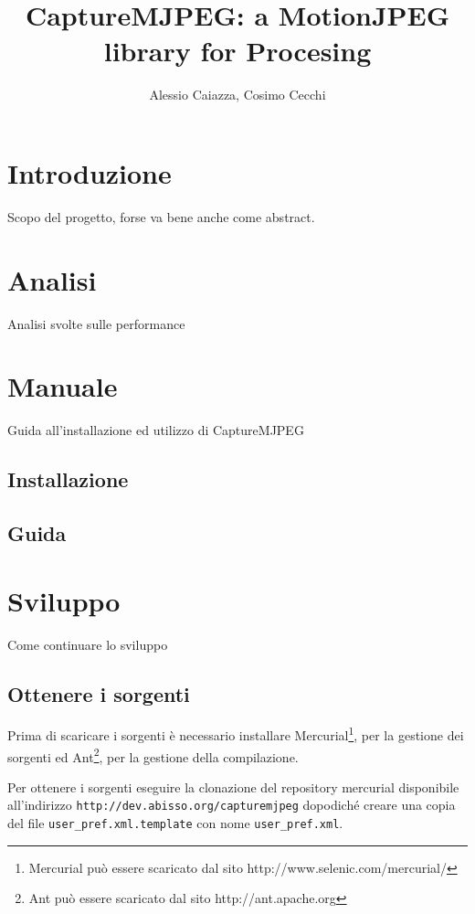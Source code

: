 \documentclass[a4paper,11pt]{article}
\author{Alessio Caiazza, Cosimo Cecchi}
\title{CaptureMJPEG: a MotionJPEG library for Procesing}
\begin{document}
\maketitle
\tableofcontents

\section{Introduzione}
\label{sec:introduzione}
Scopo del progetto, forse va bene anche come abstract.

\section{Analisi}
\label{sec:analisi}
Analisi svolte sulle performance

\section{Manuale}
\label{sec:manuale}
Guida all'installazione ed utilizzo di CaptureMJPEG
\subsection{Installazione}
\label{sec:installazione}

\subsection{Guida}
\label{sec:guida}



\section{Sviluppo}
\label{sec:sviluppo}
Come continuare lo sviluppo
\subsection{Ottenere i sorgenti}
\label{sec:sorgenti}
Prima di scaricare i sorgenti è necessario installare
Mercurial\footnote{Mercurial può essere scaricato dal sito
 http://www.selenic.com/mercurial/}, 
per la gestione dei sorgenti ed Ant\footnote{Ant può essere scaricato
dal sito http://ant.apache.org}, 
per la gestione della compilazione.

Per ottenere i sorgenti eseguire la clonazione del repository
mercurial disponibile all'indirizzo
\texttt{http://dev.abisso.org/capturemjpeg} 
dopodiché creare una copia del file \texttt{user\_pref.xml.template}
con nome \texttt{user\_pref.xml}.
\end{document}
